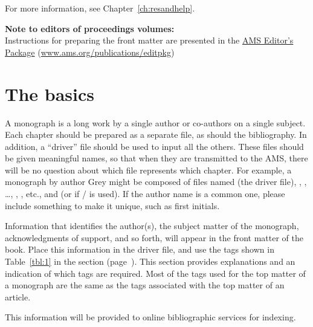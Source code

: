 \noindent For more information, see Chapter~\ref{ch:resandhelp}.

\ifproceedings
 \bigskip

 \textbf{Note to editors of proceedings volumes:}\\
 Instructions for preparing the front matter are presented in the 
 \href{http://http://www.ams.org/publications/books/collproc/editpkg}%
 {AMS Editor's Package} (\url{www.ams.org/publications/editpkg})

\newpage
\fi

\ifjournal \newpage \fi


\ifmonograph

\clearpage

\section*{The basics}

A monograph is a long work by a single author or co-authors on a
single subject.  Each chapter should be prepared as a separate file,
as should the bibliography.  In addition, a ``driver'' file should be
used to input all the others.  These files should be given meaningful
names, so that when they are transmitted to the AMS, there will be no
question about which file represents which chapter.  For example, a
monograph by author Grey might be composed of files named
 (the driver file), ,
, \dots, ,
, etc., and  (or
 if \bibtex/ is used).
If the author name is a common one, please include something to make
it unique, such as first initials.

Information that identifies the author(s), the subject matter of the
monograph, acknowledgments of support, and so forth, will appear in the
front matter of the book.  Place this information in the driver file,
and use the tags shown in Table~\ref{tbl:1} in the
\textit{} section (page~\pageref{s:topmatter}).
This section provides
explanations and an indication of which tags are required.
Most of the tags used for the top matter of a monograph are the same
as the tags associated with the top matter of an article.

This information will be provided to online bibliographic services
for indexing.

